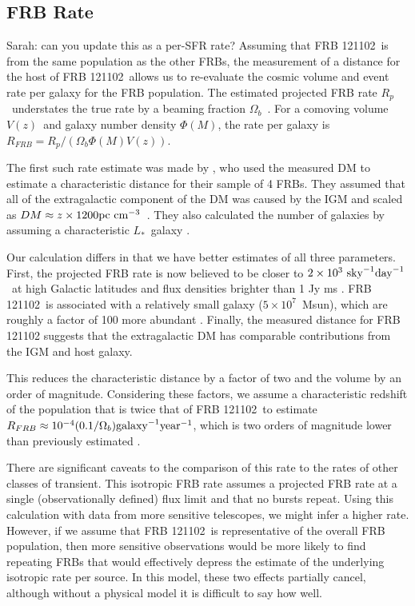 \documentclass[twocolumn]{aastex61}
\newcommand{\frb}{FRB 121102}
\begin{document}
\subsection{FRB Rate}
{\color{red} Sarah: can you update this as a per-SFR rate?}
Assuming that \frb\ is from the same population as the other FRBs, the measurement of a distance for the host of \frb\ allows us to re-evaluate the cosmic volume and event rate per galaxy for the FRB population. The estimated projected FRB rate $R_p$\ understates the true rate by a beaming fraction $\Omega_b$\ \citep[$\sim$10\%;][]{1998MNRAS.298..625T}. For a comoving volume $V(z)$\ and galaxy number density $\Phi(M)$, the rate per galaxy is $R_{FRB} = R_p /(\Omega_b \Phi(M)V (z))$. 

The first such rate estimate was made by \citet{2013Sci...341...53T}, who used the measured DM to estimate a characteristic distance for their sample of 4 FRBs. They assumed that all of the extragalactic component of the DM was caused by the IGM and scaled as $DM\approx z\times1200 \rm{pc}\ \rm{cm}^{-3}$\ \citep{2003ApJ...598L..79I,2004MNRAS.348..999I}. They also calculated the number of galaxies by assuming a characteristic $L_*$\ galaxy \citep[corresponding to stellar mass $M_* \approx 1011 M$;][]{2012MNRAS.421..621B}.

Our calculation differs in that we have better estimates of all three parameters. First, the projected FRB rate is now believed to be closer to $2\times10^3\ \rm{sky}^{-1} \rm{day}^{-1}$\ at high Galactic latitudes and flux densities brighter than 1 Jy ms \citep{2016arXiv161100458L,2016MNRAS.460L..30C, 2016MNRAS.455.2207R}. \frb\ is associated with a relatively small galaxy ($5\times10^7$\ Msun), which are roughly a factor of 100 more abundant \citep[$\Phi(M) \approx 10^{-2} \rm{Mpc}^{-3}$;][]{2007ApJ...665..265F}. Finally, the measured distance for FRB 121102 suggests that the extragalactic DM has comparable contributions from the IGM and host galaxy.

This reduces the characteristic distance by a factor of two and the volume by an order of magnitude. Considering these factors, we assume a characteristic redshift of the population that is twice that of \frb\ to estimate $R_{FRB} \approx 10^{-4} (0.1/\Omega_b) \rm{galaxy}^{-1} \rm{year}^{-1}$, which is two orders of magnitude lower than previously estimated \citep[assuming isotropic radiation;]{2013Sci...341...53T}.

There are significant caveats to the comparison of this rate to the rates of other classes of transient. This isotropic FRB rate assumes a projected FRB rate at a single (observationally defined) flux limit and that no bursts repeat. Using this calculation with data from more sensitive telescopes, we might infer a higher rate. However, if we assume that \frb\ is representative of the overall FRB population, then more sensitive observations would be more likely to find repeating FRBs that would effectively depress the estimate of the underlying isotropic rate per source. In this model, these two effects partially cancel, although without a physical model it is difficult to say how well.
\end{document}
